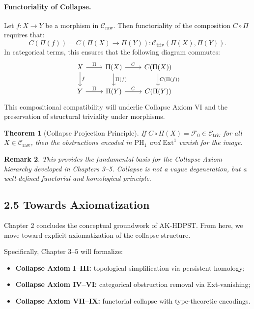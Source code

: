 \documentclass[11pt]{article}
\newtheorem{theorem}{Theorem}[section]
\newtheorem{remark}[theorem]{Remark}
\begin{document}
\paragraph{Functoriality of Collapse.}  
Let \( f : X \to Y \) be a morphism in \( \mathcal{C}_{\text{raw}} \).  
Then functoriality of the composition \( C \circ \Pi \) requires that:
\[
C(\Pi(f)) = C(\Pi(X) \to \Pi(Y)) : \mathcal{C}_{\text{triv}}(\Pi(X), \Pi(Y)).
\]
In categorical terms, this ensures that the following diagram commutes:
\[
\begin{tikzcd}
X \arrow[d, "f"] \arrow[r, "\Pi"] & \Pi(X) \arrow[d, "\Pi(f)"] \arrow[r, "C"] & C(\Pi(X)) \arrow[d, "C(\Pi(f))"] \\
Y \arrow[r, "\Pi"] & \Pi(Y) \arrow[r, "C"] & C(\Pi(Y))
\end{tikzcd}
\]
This compositional compatibility will underlie Collapse Axiom VI and the preservation of structural triviality under morphisms.

\begin{theorem}[Collapse Projection Principle]
If \( C \circ \Pi(X) = \mathcal{F}_0 \in \mathcal{C}_{\text{triv}} \) for all \( X \in \mathcal{C}_{\text{raw}} \),  
then the obstructions encoded in \( \mathrm{PH}_1 \) and \( \mathrm{Ext}^1 \) vanish for the image.
\end{theorem}

\begin{remark}
This provides the fundamental basis for the Collapse Axiom hierarchy developed in Chapters 3–5.  
Collapse is not a vague degeneration, but a well-defined functorial and homological principle.
\end{remark}

\subsection*{2.5 Towards Axiomatization}

Chapter 2 concludes the conceptual groundwork of AK-HDPST.  
From here, we move toward explicit axiomatization of the collapse structure.

Specifically, Chapter 3–5 will formalize:

\begin{itemize}
  \item \textbf{Collapse Axiom I–III:} topological simplification via persistent homology;
  \item \textbf{Collapse Axiom IV–VI:} categorical obstruction removal via Ext-vanishing;
  \item \textbf{Collapse Axiom VII–IX:} functorial collapse with type-theoretic encodings.
\end{itemize}
\end{document}

